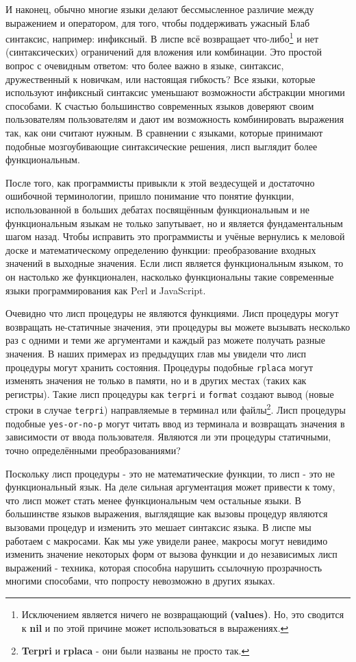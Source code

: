 И наконец, обычно многие языки делают бессмысленное различие между выражением и оператором, для того, чтобы поддерживать ужасный Блаб синтаксис, например: инфиксный. В лиспе всё возвращает что-либо\footnote{Исключением является ничего не возвращающий \textbf{(values)}. Но, это сводится к \textbf{nil} и по этой причине может использоваться в выражениях. } и нет (синтаксических) ограничений для вложения или комбинации. Это простой вопрос с очевидным ответом: что более важно в языке, синтаксис, дружественный к новичкам, или настоящая гибкость? Все языки, которые используют инфиксный синтаксис уменьшают возможности абстракции многими способами. К счастью большинство современных языков доверяют своим пользователям пользователям и дают им возможность комбинировать выражения так, как они считают нужным. В сравнении с языками, которые принимают подобные мозгоубивающие синтаксические решения, лисп выглядит более функциональным. 

После того, как программисты привыкли к этой вездесущей и достаточно ошибочной терминологии, пришло понимание что понятие функции, использованной в больших дебатах посвящённым функциональным и не функциональным языкам не только запутывает, но и является фундаментальным шагом назад. Чтобы исправить это программисты и учёные вернулись к меловой доске и математическому определению функции: преобразование входных значений в выходные значения. Если лисп является функциональным языком, то он настолько же функционален, насколько функциональны такие современные языки программирования как Perl и JavaScript. 

Очевидно что лисп процедуры не являются функциями. Лисп процедуры могут возвращать не-статичные значения, эти процедуры вы можете вызывать несколько раз с одними и теми же аргументами и каждый раз можете получать разные значения. В наших примерах из предыдущих глав мы увидели что лисп процедуры могут хранить состояния. Процедуры подобные \verb"rplaca" могут изменять значения не только в памяти, но и в других местах (таких как регистры). Такие лисп процедуры как \verb"terpri" и \verb"format" создают вывод (новые строки в случае \verb"terpri") направляемые в терминал или файлы\footnote{\textbf{Terpri} и \textbf{rplaca} - они были названы не просто так.}. Лисп процедуры подобные \verb"yes-or-no-p" могут читать ввод из терминала и возвращать значения в зависимости от ввода пользователя. Являются ли эти процедуры статичными, точно определёнными преобразованиями? 

Поскольку лисп процедуры - это не математические функции, то лисп - это не функциональный язык. На деле сильная аргументация может привести к тому, что лисп может стать менее функциональным чем остальные языки. В большинстве языков выражения, выглядящие как вызовы процедур являются вызовами процедур и изменить это мешает синтаксис языка. В лиспе мы работаем с макросами. Как мы уже увидели ранее, макросы могут невидимо изменить значение некоторых форм от вызова функции и до независимых лисп выражений - техника, которая способна нарушить ссылочную прозрачность многими способами, что попросту невозможно в других языках.

